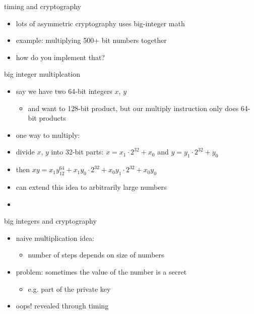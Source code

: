 \begin{frame}{timing and cryptography}
    \begin{itemize}
    \item lots of asymmetric cryptography uses big-integer math
    \item example: multiplying 500+ bit numbers together
    \vspace{.5cm}
    \item how do you implement that?
    \end{itemize}
\end{frame}

\begin{frame}{big integer multiplcation}
    \begin{itemize}
    \item say we have two 64-bit integers $x$, $y$
        \begin{itemize}
        \item and want to 128-bit product, but our multiply instruction only does 64-bit products
        \end{itemize}
    \item one way to multiply:
    \vspace{.5cm}
    \item divide $x$, $y$ into 32-bit parts: $x=x_1\cdot2^{32}+x_0$ and $y=y_1\cdot2^{32}+y_0$
    \item then $xy = x_1y_12^{64}+x_1y_0\cdot2^{32}+x_0y_1\cdot2^{32}+x_0y_0$
    \vspace{.5cm}
    \item<2-> can extend this idea to arbitrarily large numbers
    \item<2-> 
    \end{itemize}
\end{frame}

\begin{frame}{big integers and cryptography}
    \begin{itemize}
    \item naive multiplication idea:
        \begin{itemize}
        \item number of steps depends on size of numbers
        \end{itemize}
    \item problem: sometimes the value of the number is a secret
        \begin{itemize}
        \item e.g. part of the private key
        \end{itemize}
    \item oops! revealed through timing
    \end{itemize}
\end{frame}

